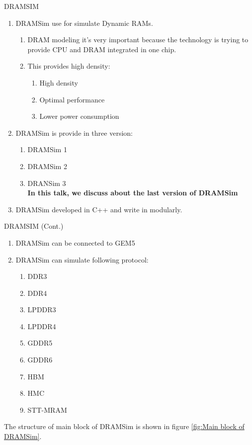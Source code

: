 \documentclass{beamer}
\begin{document}
\begin{frame}{DRAMSIM}
	\begin{enumerate}
		\item DRAMSim use for simulate Dynamic RAMs.
		\begin{enumerate}
			\item DRAM modeling it's very important because the technology is trying to provide CPU and DRAM integrated in one chip.
			\item This provides high density:
			\begin{enumerate}
				\item High density
				\item Optimal performance
				\item Lower power consumption
			\end{enumerate}
		\end{enumerate}
		\item DRAMSim is provide in three version:
		\begin{enumerate}
			\item DRAMSim 1
			\item DRAMSim 2
			\item DRANSim 3\\
			\textbf{In this talk, we discuss about the last version of DRAMSim}
		\end{enumerate}
		\item DRAMSim developed in C++ and write in modularly.
	\end{enumerate}
\end{frame}





\begin{frame}{DRAMSIM (Cont.)}
	\begin{enumerate}
		\item DRAMSim can be connected to GEM5
		\item DRAMSim can simulate following protocol:
		\begin{enumerate}
			\item DDR3
			\item DDR4
			\item ‫‪LPDDR3‬‬
			\item ‫‪LPDDR4‬‬
			\item ‫‪GDDR5‬‬
			\item ‫‪GDDR6‬‬
			\item HBM
			\item HMC
			\item ‫‪STT-MRAM‬‬
		\end{enumerate}
	\end{enumerate}
	
	The structure of main block of DRAMSim is shown in figure \ref{fig:Main block of DRAMSim}.
\end{frame}
\end{document}
